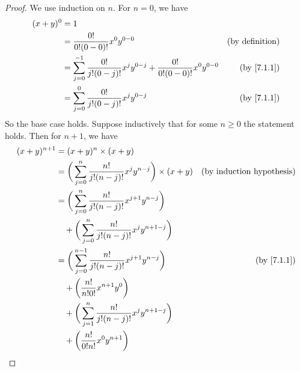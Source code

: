 \begin{proof}
  We use induction on \(n\).
  For \(n = 0\), we have
  \begin{align*}
    (x + y)^0 & = 1                                                                                                                      \\
              & = \frac{0!}{0!(0 - 0)!} x^0 y^{0 - 0}                                                         & \text{(by definition)}   \\
              & = \sum_{j = 0}^{-1} \frac{0!}{j!(0 - j)!} x^j y^{0 - j} + \frac{0!}{0!(0 - 0)!} x^0 y^{0 - 0} & \text{(by \cref{7.1.1})} \\
              & = \sum_{j = 0}^0 \frac{0!}{j!(0 - j)!} x^j y^{0 - j}                                          & \text{(by \cref{7.1.1})}
  \end{align*}
  So the base case holds.
  Suppose inductively that for some \(n \geq 0\) the statement holds.
  Then for \(n + 1\), we have
  \begin{align*}
    (x + y)^{n + 1} & = (x + y)^n \times (x + y)                                                                                                    \\
                    & = \bigg(\sum_{j = 0}^n \frac{n!}{j!(n - j)!} x^j y^{n - j}\bigg) \times (x + y)            & \text{(by induction hypothesis)} \\
                    & = \bigg(\sum_{j = 0}^n \frac{n!}{j!(n - j)!} x^{j + 1} y^{n - j}\bigg)                                                        \\
                    & \quad + \bigg(\sum_{j = 0}^n \frac{n!}{j!(n - j)!} x^j y^{n + 1 - j}\bigg)                                                    \\
                    & = \bigg(\sum_{j = 0}^{n - 1} \frac{n!}{j!(n - j)!} x^{j + 1} y^{n - j}\bigg)               & \text{(by \cref{7.1.1})}         \\
                    & \quad + \bigg(\frac{n!}{n!0!} x^{n + 1} y^0\bigg)                                                                             \\
                    & \quad + \bigg(\sum_{j = 1}^n \frac{n!}{j!(n - j)!} x^j y^{n + 1 - j}\bigg)                                                    \\
                    & \quad + \bigg(\frac{n!}{0!n!} x^0 y^{n + 1}\bigg)                                                                             \\

\end{align*}
\end{proof}

